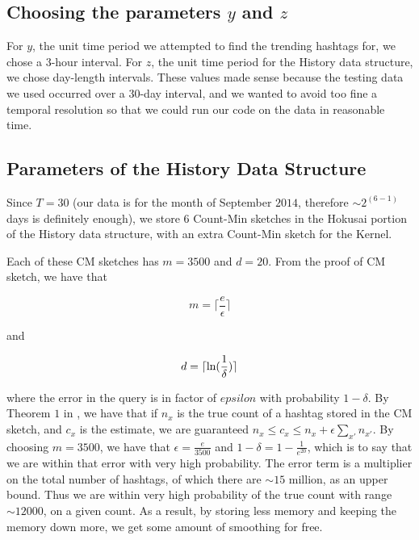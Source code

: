 \documentclass[twoside]{article}
\newcommand{\cc}[1]
 {\textbf{\cite{#1}}}
\begin{document}
{%
\subsection{Choosing the parameters $y$ and $z$}
For $y$, the unit time period we attempted to find the trending hashtags for, we chose a $3$-hour interval.
For $z$, the unit time period for the History data structure, we chose day-length intervals. These values made sense because the testing data we used occurred over a $30$-day interval, and we wanted to avoid too fine a temporal resolution so that we could run our code on the data in reasonable time.

\subsection{Parameters of the History Data Structure}
Since $T = 30$ (our data is for the month of September $2014$, therefore $\sim 2^{(6-1)}$ days is definitely enough), we store $6$ Count-Min
sketches in the Hokusai portion of the History data structure, with an extra Count-Min 
sketch for the Kernel. 

Each of these CM sketches has $m = 3500$ and $d = 20$. From the proof of CM sketch, we have that

\begin{equation}
\label{eq:error_control}
m = \lceil \frac{e}{\epsilon} \rceil
\end{equation}

and 

\begin{equation}
\label{eq:certainty_control}
d = \lceil \textnormal{ln}(\frac{1}{\delta}) \rceil
\end{equation}

where the error in the query is in factor of $epsilon$ with probability $1 - \delta$. By Theorem $1$ in \cc{Matusevych:2012}, we have that if $n_x$ is the true count of a hashtag stored in the CM sketch, and $c_x$ is the estimate, we are guaranteed $n_x \leq c_x \leq n_x + \epsilon \sum_{x'} n_{x'}$. 
By choosing $m = 3500$, we have that $\epsilon = \frac{e}{3500}$ and $1 - \delta = 1 - \frac{1}{e^{20}}$, which is to say that we are within that error with very high probability. The error term is a multiplier on the total number of hashtags, of which there are $\sim 15$ million, as an upper bound. Thus we are within very high probability of the true count with range $\sim 12000$, on a given count. As a result, by storing less memory and keeping the memory down more, we get some amount of smoothing for free. 

}
\end{document}
